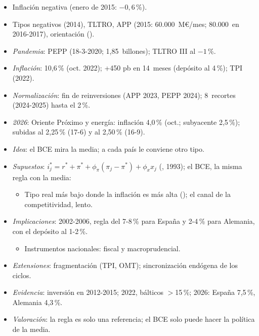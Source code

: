 \documentclass{article}
\begin{document}
\begin{columnas}
\begin{itemize}
\item Inflación negativa (enero de 2015: $-0{,}6$\,\%).
\item Tipos negativos (2014), TLTRO, APP (2015: 60.000~M€/mes; 80.000~en 2016-2017), orientación ().
\end{itemize}

\begin{itemize}
\item \emph{Pandemia}: PEPP (18-3-2020; 1,85~billones); TLTRO III al $-1$\,\%.
\item \emph{Inflación}: 10,6\,\% (oct. 2022); +450 pb en 14~meses (depósito al 4\,\%); TPI (2022).
\item \emph{Normalización}: fin de reinversiones (APP 2023, PEPP 2024); 8~recortes (2024-2025) hasta el 2\,\%.
\item \emph{2026}: Oriente Próximo y energía: inflación 4,0\,\% (oct.; subyacente 2,5\,\%); subidas al 2,25\,\% (17-6) y al 2,50\,\% (16-9).
\end{itemize}

\begin{itemize}
\item \emph{Idea}: el BCE mira la media; a cada país le conviene otro tipo.
\item \emph{Supuestos}: $i_j^*=r^*+\pi^*+\phi_\pi(\pi_j-\pi^*)+\phi_x x_j$ (, 1993); el BCE, la misma regla con la media:
  \begin{itemize}
  \item Tipo real más bajo donde la inflación es más alta (); el canal de la competitividad, lento.
  \end{itemize}
\item \emph{Implicaciones}: 2002-2006, regla del 7-8\,\% para España y 2-4\,\% para Alemania, con el depósito al 1-2\,\%.
  \begin{itemize}
  \item Instrumentos nacionales: fiscal y macroprudencial.
  \end{itemize}
\item \emph{Extensiones}: fragmentación (TPI, OMT); sincronización endógena de los ciclos.
\item \emph{Evidencia}: inversión en 2012-2015; 2022, bálticos $>$15\,\%; 2026: España 7,5\,\%, Alemania 4,3\,\%.
\item \emph{Valoración}: la regla es solo una referencia; el BCE solo puede hacer la política de la media.
\end{itemize}


\end{columnas}
\end{document}
